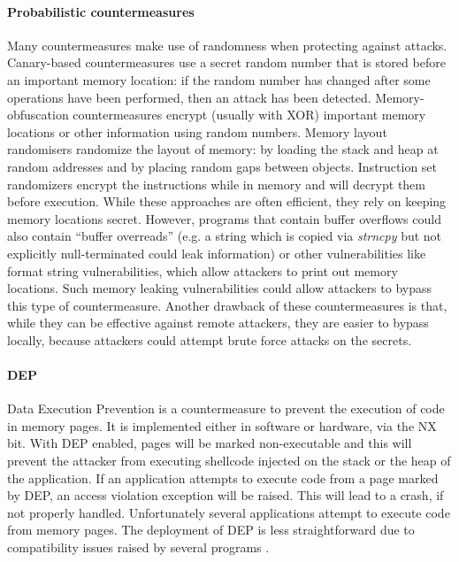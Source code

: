 \paragraph{Probabilistic countermeasures}
Many countermeasures make use of randomness when protecting against attacks. Canary-based countermeasures \cite{Krennmair:2003:CLE,Robertson:2003:RTD} 
use a secret random number that is stored before an important memory location: if the random number has changed after some operations have been performed, then an attack has been detected. Memory-obfuscation countermeasures \cite{Bhatkar:2008:DSR,Cowan:2003:PPP} encrypt (usually with XOR) important memory locations or other information using random numbers.  Memory layout randomisers \cite{Bhatkar:2003:AOE,Bhatkar:2005:ETC,Xu:2003:TRR} 
randomize the layout of memory: by loading the stack and heap at random addresses and by placing random gaps between objects. Instruction set randomizers \cite{Barrantes:2003:RIS}
encrypt the instructions while in memory and will decrypt them before execution. While these approaches are often efficient, they rely on keeping memory locations secret. However, programs that contain buffer overflows could also contain ``buffer overreads'' (e.g. a string which is copied via \emph{strncpy} but not explicitly null-terminated could leak information) or other vulnerabilities like format string vulnerabilities, which allow attackers to print out memory locations. Such memory leaking vulnerabilities could allow attackers to bypass this type of countermeasure. Another drawback of these countermeasures is that, while they can be effective against remote attackers, they are easier to bypass locally, because attackers could attempt brute force attacks on the secrets.
 
\paragraph{DEP}
Data Execution Prevention \cite{dep} is a countermeasure to prevent the execution of code in memory pages. It is implemented  either in software or hardware, via the NX bit. With DEP enabled, pages will be marked non-executable and this will prevent the attacker from executing shellcode injected on the stack or the heap of the application. If an application attempts to execute code from a page marked by DEP, an access violation exception will be raised. This will lead to a crash, if not properly handled.
Unfortunately several applications attempt to execute code from memory pages. The deployment of DEP is less straightforward due to compatibility issues raised by several programs \cite{depdef}.

